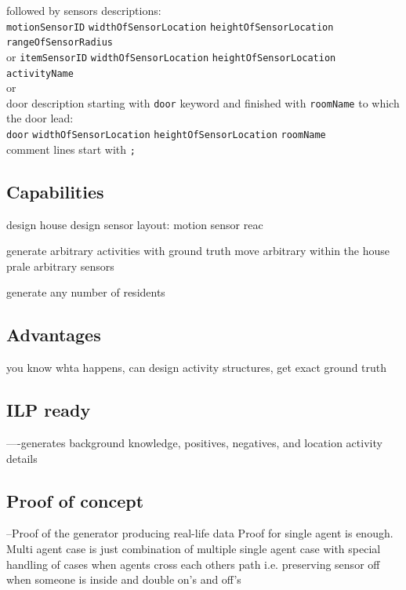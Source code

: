\documentclass[12pt, a4paper, pdflatex, leqno, twoside, openright]{report}
\begin{document}
followed by sensors descriptions:\\
\texttt{motionSensorID} \texttt{widthOfSensorLocation} \texttt{heightOfSensorLocation} \texttt{rangeOfSensorRadius}\\
or
\texttt{itemSensorID} \texttt{widthOfSensorLocation} \texttt{heightOfSensorLocation} \texttt{activityName}\\
or\\
door description starting with \texttt{door} keyword and finished with \texttt{roomName} to which the door lead:\\
\texttt{door} \texttt{widthOfSensorLocation} \texttt{heightOfSensorLocation} \texttt{roomName}\\

comment lines start with \texttt{;}\\

    \subsection{Capabilities}
design house
design sensor layout: motion sensor reac

generate arbitrary activities
with ground truth
move arbitrary within the house
prale arbitrary sensors

generate any number of residents

    \subsection{Advantages}

you know whta happens, can design activity structures, get exact ground truth

    \subsection{ILP ready}
----generates background knowledge, positives, negatives, and location activity details
    \subsection{Proof of concept}
--Proof of the generator producing real-life data
Proof for single agent is enough.
Multi agent case is just combination of multiple single agent case with special handling of cases when agents cross each others path i.e. preserving sensor off when someone is inside and double on's and off's\\
\end{document}
